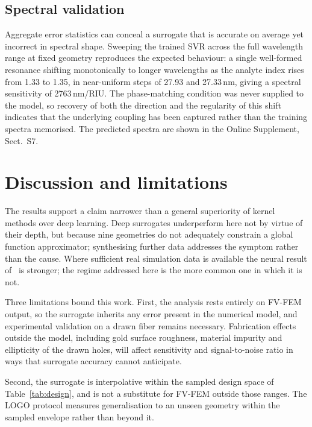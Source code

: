\documentclass[iicol,pdflatex,sn-basic,Numbered]{sn-jnl}
\begin{document}
\subsection{Spectral validation}\label{sec:spectral}

Aggregate error statistics can conceal a surrogate that is accurate on average
yet incorrect in spectral shape. Sweeping the trained SVR across the full
wavelength range at fixed geometry reproduces the expected behaviour: a single
well-formed resonance shifting monotonically to longer wavelengths as the
analyte index rises from 1.33 to 1.35, in near-uniform steps of 27.93 and
27.33\,nm, giving a spectral sensitivity of 2763\,nm/RIU. The phase-matching condition was never supplied to
the model, so recovery of both the direction and the regularity of this shift
indicates that the underlying coupling has been captured rather than the
training spectra memorised. The predicted spectra are shown in the Online
Supplement, Sect.~S7.


\section{Discussion and limitations}\label{sec:discussion}

The results support a claim narrower than a general superiority of kernel methods
over deep learning. Deep surrogates underperform here not by virtue of their
depth, but because nine geometries do not adequately constrain a global function
approximator; synthesising further data addresses the symptom rather than the
cause. Where sufficient real simulation data is available the neural result
of~\cite{ehyaee2024} is stronger; the regime addressed here is the more common
one in which it is not.

Three limitations bound this work. First, the analysis rests entirely on FV-FEM
output, so the surrogate inherits any error present in the numerical model, and
experimental validation on a drawn fiber remains necessary. Fabrication effects
outside the model, including gold surface roughness, material impurity and
ellipticity of the drawn holes, will affect sensitivity and signal-to-noise
ratio in ways that surrogate accuracy cannot anticipate.

Second, the surrogate is interpolative within the sampled design space of
Table~\ref{tab:design}, and is not a substitute for FV-FEM outside those ranges.
The LOGO protocol measures generalisation to an unseen geometry within the
sampled envelope rather than beyond it.
\end{document}
